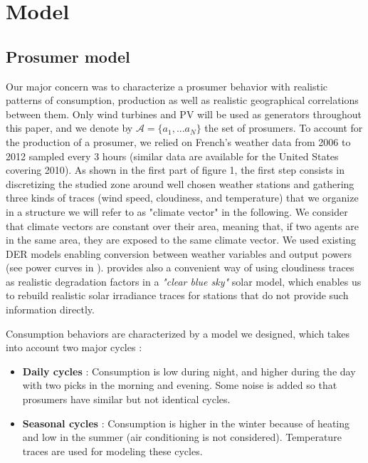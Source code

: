 \documentclass[conference]{IEEEtran}
\begin{document}
%
%

\section{Model}
\label{sec:model}
\subsection{Prosumer model}\label{subsec:ProsumerModel}

Our major concern was to characterize a prosumer behavior with realistic patterns of consumption, production as well as realistic geographical correlations between them. Only wind turbines and PV will be used as generators throughout this paper, and we denote by $ \mathcal{A} = \{ a_{1},...a_{N} \} $ the set of prosumers. To account for the production of a prosumer, we relied on French's weather data from 2006 to 2012 sampled every 3 hours \cite{Infoclimat} (similar data are available for the United States covering 2010\cite{NCDC}). As shown in the first part of figure 1, the first step consists in discretizing the studied zone around well chosen weather stations and gathering three kinds of traces (wind speed, cloudiness, and temperature) that we organize in a structure we will refer to as "climate vector" in the following. We consider that climate vectors are constant over their area, meaning that, if two agents are in the same area, they are exposed to the same climate vector. We used existing DER models enabling conversion between weather variables and output powers (see power curves in \cite{Kota2011} \cite{windturbinemodel}). \cite{Dans2007} provides also a convenient way of using cloudiness traces as realistic degradation factors in a \textit{"clear blue sky"} solar model, which enables us to rebuild realistic solar irradiance traces for stations that do not provide such information directly.

Consumption behaviors are characterized by a model we designed, which takes into account two major cycles : 

\begin{itemize}
\item \textbf{Daily cycles} : Consumption is low during night, and higher during the day with two picks in the morning and evening. Some noise is added so that prosumers have similar but not identical cycles.
\item \textbf{Seasonal cycles} : Consumption is higher in the winter because of heating and low in the summer (air conditioning is not considered). Temperature traces are used for modeling these cycles.
\end{itemize} 
\end{document}
